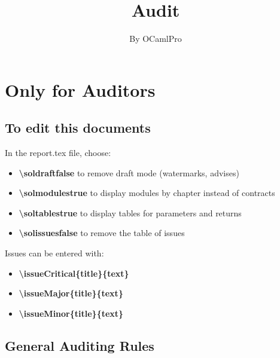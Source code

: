 \documentclass{report}
\newif\ifsolissues
\newif\ifsoldraft
\begin{document}
\title{Audit}
\author{By OCamlPro}
\maketitle
\dominitoc
\ifsolissues
\listoffigures
\fi
\tableofcontents

\ifsoldraft
\chapter{Only for Auditors}

\section{To edit this documents}

In the report.tex file, choose:
\begin{itemize}
\item{\bf \textbackslash{}soldraftfalse} to remove draft mode (watermarks, advises)
\item{\bf \textbackslash{}solmodulestrue} to display modules by chapter instead of contracts
\item{\bf \textbackslash{}soltablestrue} to display tables for parameters and returns
\item{\bf \textbackslash{}solissuesfalse} to remove the table of issues
\end{itemize}

Issues can be entered with:
\begin{itemize}
\item{\bf \textbackslash{}issueCritical\{title\}\{text\}}
\item{\bf \textbackslash{}issueMajor\{title\}\{text\}}
\item{\bf \textbackslash{}issueMinor\{title\}\{text\}}
\end{itemize}

\section{General Auditing Rules}
\end{document}
